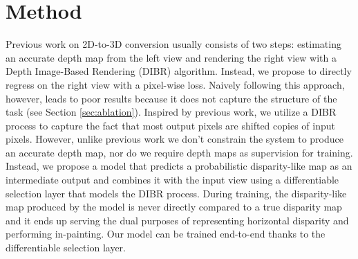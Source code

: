 \documentclass[runningheads]{llncs}
\begin{document}
\section{Method}
Previous work on 2D-to-3D conversion usually consists of two steps: estimating an accurate depth map from the left view and rendering the right view with a Depth Image-Based Rendering (DIBR) algorithm.
Instead, we propose to directly regress on the right view with a pixel-wise loss.
Naively following this approach, however, leads to poor results because it does not capture the structure of the task (see Section \ref{sec:ablation}).
Inspired by previous work, we utilize a DIBR process to capture the fact that most output pixels are shifted copies of input pixels.
However, unlike previous work we don't constrain the system to produce an accurate depth map, nor do we require depth maps as supervision for training.
Instead, we propose a model that predicts a probabilistic disparity-like map as an intermediate output and combines it with the input view using a differentiable selection layer that models the DIBR process.
During training, the disparity-like map produced by the model is never directly compared to a true disparity map and it ends up serving the dual purposes of representing horizontal disparity and performing in-painting.
Our model can be trained end-to-end thanks to the differentiable selection layer.
\end{document}
